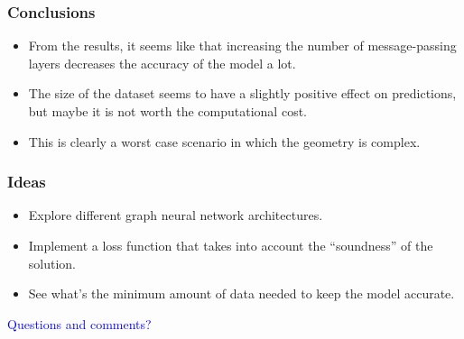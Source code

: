 \documentclass{beamer}
\begin{document}
\begin{frame}
    \frametitle{Conclusions}
    \begin{itemize}
        \item From the results, it seems like that increasing the number of message-passing layers decreases the accuracy of the model a lot.
        \item The size of the dataset seems to have a slightly positive effect on predictions, but maybe it is not worth the computational cost.
        \item This is clearly a worst case scenario in which the geometry is complex.
    \end{itemize}
\end{frame}


\begin{frame}
    \frametitle{Ideas}
    \begin{itemize}
        \item Explore different graph neural network architectures.
        \item Implement a loss function that takes into account the ``soundness'' of the solution.
        \item See what's the minimum amount of data needed to keep the model accurate.
        
    \end{itemize}
\end{frame}

\begin{frame}
    \begin{center}
        \Huge{\textcolor{blue}{Questions and comments?}}
    \end{center}
\end{frame}
\end{document}

